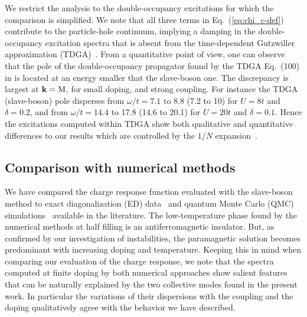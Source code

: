 \documentclass[showpacs,amsmath,twocolumn,floatfix]{revtex4-1}
\begin{document}
We restrict the analysis to the double-occupancy excitations for which the 
comparison is simplified. We note that all three terms in Eq.~(\ref{eq:chi_c-def}) 
contribute to the particle-hole continuum, implying a damping in the 
double-occupancy excitation spectra that is absent from the time-dependent 
Gutzwiller approximation (TDGA)~\cite{Bun13}. From a quantitative point of view, 
one can observe that the pole of the double-occupancy propagator found by the TDGA 
Eq.~(100) in \cite{Bun13} is located at an energy smaller that the slave-boson one. 
The discrepancy is largest at ${\bf k}={\rm M}$, for small doping, and strong 
coupling. For instance the TDGA (slave-boson) pole disperses from $\omega/t=7.1$ 
to 8.8 (7.2 to 10) for $U=8t$ and $\delta=0.2$, and from $\omega/t=14.4$ to 17.8 
(14.6 to 20.1) for $U=20t$ and $\delta=0.1$. Hence the excitations computed within
TDGA show both qualitative and quantitative differences to our results which are
controlled by the $1/N$ expansion~\cite{FW}.

\subsection{Comparison with numerical methods}


We have compared the charge response function evaluated with the slave-boson method 
to exact diagonalization (ED) data~\cite{Bun13,Jia12,Wan14} and quantum Monte Carlo 
(QMC) simulations~\cite{Zim97,DziUnpub,Che94,Buh99,Bec00,Pre97,Gro00,Koh04,Kun15}
available in the literature. The low-temperature phase found by the numerical 
methods at half filling is an antiferromagnetic insulator. 
But, as confirmed by our investigation of instabilities, the paramagnetic  
solution becomes predominant with increasing doping and temperature. 
Keeping this in mind when comparing our evaluation of the charge response, we note 
that the spectra computed at finite doping by both numerical approaches show salient 
features that can be naturally explained by the two collective modes found in the 
present work. In particular the variations of their dispersions with the coupling 
and the doping qualitatively agree with the behavior we have described.
\end{document}
